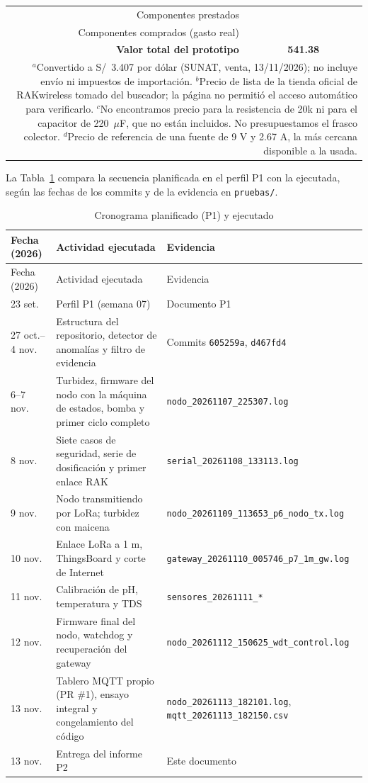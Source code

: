 {\begin{longtable}{r >{\raggedright\arraybackslash}p{5.6cm} c r r l >{\raggedright\arraybackslash}p{2.6cm}}
\midrule
\multicolumn{4}{r}{Componentes prestados} & 472.58 & & \\
\multicolumn{4}{r}{Componentes comprados (gasto real)} & 68.80 & & \\
\multicolumn{4}{r}{\textbf{Valor total del prototipo}} & \textbf{541.38} & & \\
\bottomrule
\multicolumn{7}{p{0.97\textwidth}}{\scriptsize $^{a}$Convertido a S/~3.407 por dólar (SUNAT, venta, 13/11/2026); no incluye envío ni impuestos de importación. $^{b}$Precio de lista de la tienda oficial de RAKwireless tomado del buscador; la página no permitió el acceso automático para verificarlo. $^{c}$No encontramos precio para la resistencia de 20k ni para el capacitor de 220~$\mu$F, que no están incluidos. No presupuestamos el frasco colector. $^{d}$Precio de referencia de una fuente de 9 V y 2.67 A, la más cercana disponible a la usada.}
\end{longtable}
}

La Tabla~\ref{tab:cronograma} compara la secuencia planificada en el perfil P1 con la ejecutada, según las fechas de los commits y de la evidencia en \texttt{pruebas/}.

{\small
\begin{longtable}{p{2.4cm} p{6.4cm} >{\footnotesize}p{6.8cm}}
\caption{Cronograma planificado (P1) y ejecutado}
\label{tab:cronograma} \\
\toprule
Fecha (2026) & Actividad ejecutada & Evidencia \\
\midrule
\endfirsthead
\toprule
Fecha (2026) & Actividad ejecutada & Evidencia \\
\midrule
\endhead
23 set. & Perfil P1 (semana 07) & Documento P1 \\
27 oct.--4 nov. & Estructura del repositorio, detector de anomalías y filtro de evidencia & Commits \texttt{605259a}, \texttt{d467fd4} \\
6--7 nov. & Turbidez, firmware del nodo con la máquina de estados, bomba y primer ciclo completo & \texttt{nodo\_20261107\_225307.log} \\
8 nov. & Siete casos de seguridad, serie de dosificación y primer enlace RAK & \texttt{serial\_20261108\_133113.log} \\
9 nov. & Nodo transmitiendo por LoRa; turbidez con maicena & \texttt{nodo\_20261109\_113653\_p6\_nodo\_tx.log} \\
10 nov. & Enlace LoRa a 1 m, ThingsBoard y corte de Internet & \texttt{gateway\_20261110\_005746\_p7\_1m\_gw.log} \\
11 nov. & Calibración de pH, temperatura y TDS & \texttt{sensores\_20261111\_*} \\
12 nov. & Firmware final del nodo, watchdog y recuperación del gateway & \texttt{nodo\_20261112\_150625\_wdt\_control.log} \\
13 nov. & Tablero MQTT propio (PR \#1), ensayo integral y congelamiento del código & \texttt{nodo\_20261113\_182101.log}, \texttt{mqtt\_20261113\_182150.csv} \\
13 nov. & Entrega del informe P2 & Este documento \\
\bottomrule
\end{longtable}
}
